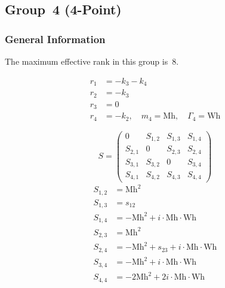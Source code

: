 \documentclass[a4paper]{article}
\begin{document}
\begin{longtable}{cc}
\end{longtable}


\subsection{Group~4 (4-Point)}
\subsubsection*{General Information}
The maximum effective rank in this group is~8.

\begin{subequations}
\begin{align}
r_{1} &= -k_{3}-k_{4}\\
r_{2} &= -k_{3}\\
r_{3} &= 0\\
r_{4} &= -k_{2},\quad m_{4} = \text{Mh},\quad \Gamma_{4} = \text{Wh}
\end{align}
\end{subequations}

\begin{equation}
S=\left(\begin{array}{cccc}
   0&
   S_{1,2}&
   S_{1,3}&
   S_{1,4}\\
   S_{2,1}&
   0&
   S_{2,3}&
   S_{2,4}\\
   S_{3,1}&
   S_{3,2}&
   0&
   S_{3,4}\\
   S_{4,1}&
   S_{4,2}&
   S_{4,3}&
   S_{4,4}\end{array}\right)
\end{equation}
\begin{subequations}
\begin{align}
   S_{1,2}&=\text{Mh}^2\\
   S_{1,3}&=s_{12}\\
   S_{1,4}&=-\text{Mh}^2+i\cdot{}\text{Mh}\cdot{}\text{Wh}\\
   S_{2,3}&=\text{Mh}^2\\
   S_{2,4}&=-\text{Mh}^2+s_{23}+i\cdot{}\text{Mh}\cdot{}\text{Wh}\\
   S_{3,4}&=-\text{Mh}^2+i\cdot{}\text{Mh}\cdot{}\text{Wh}\\
   S_{4,4}&=-2\text{Mh}^2+2i\cdot{}\text{Mh}\cdot{}\text{Wh}
\end{align}
\end{subequations}
\end{document}
